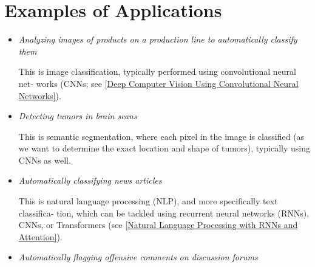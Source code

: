 \section{Examples of Applications}
\begin{itemize}
\item
\emph{Analyzing images of products on a production line to automatically classify them}

This is image classification, typically performed using convolutional neural net‐
works (CNNs; see \autoref{Deep Computer Vision Using
Convolutional Neural Networks}).
\item
\emph{Detecting tumors in brain scans}

This is semantic segmentation, where each pixel in the image is classified (as we
want to determine the exact location and shape of tumors), typically using CNNs
as well.
\item
\emph{Automatically classifying news articles}

This is natural language processing (NLP), and more specifically text classifica‐
tion, which can be tackled using recurrent neural networks (RNNs), CNNs, or
Transformers (see \autoref{Natural Language Processing with
RNNs and Attention}).
\item
\emph{Automatically flagging offensive comments on discussion forums}


\end{itemize}
